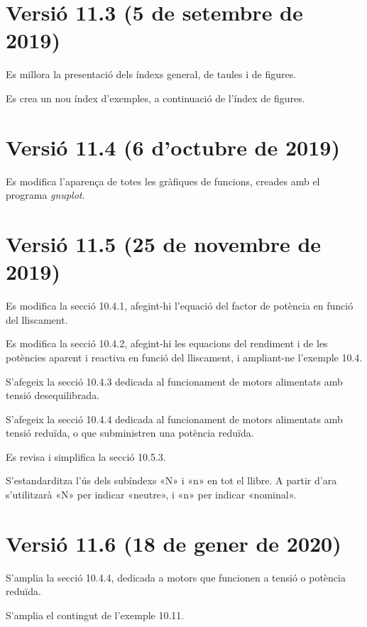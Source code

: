 \section*{Versió 11.3 (5 de setembre de 2019)}

Es millora la presentació dels índexs general, de taules i de figures.

Es crea un nou índex d'exemples, a continuació de l'índex de figures.

\section*{Versió 11.4 (6 d'octubre de 2019)}

Es modifica l'aparença de totes les gràfiques de funcions, creades amb el programa \emph{gnuplot}.

\section*{Versió 11.5 (25 de novembre de 2019)}

Es modifica la secció 10.4.1, afegint-hi l'equació del factor de potència en funció del lliscament.

Es modifica la secció 10.4.2, afegint-hi les equacions del rendiment i de les potències aparent i reactiva en funció del lliscament, i ampliant-ne l'exemple 10.4.

S'afegeix la secció 10.4.3 dedicada al funcionament de motors alimentats amb tensió desequilibrada.

S'afegeix la secció 10.4.4 dedicada al funcionament de motors alimentats amb tensió reduïda, o que subministren una potència reduïda.

Es revisa i simplifica la secció 10.5.3.

S'estandarditza l'ús dels subíndexs «N» i  «n» en tot el llibre. A partir d'ara s'utilitzarà  «N» per indicar  «neutre», i  «n» per indicar   «nominal».


\section*{Versió 11.6 (18 de gener de 2020)}

S'amplia la secció 10.4.4, dedicada a motors que funcionen a tensió o potència reduïda.

S'amplia el contingut de l'exemple 10.11.

